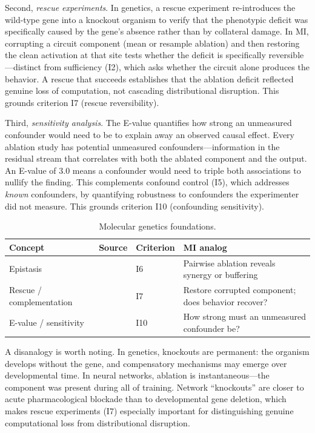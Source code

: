 \documentclass{article}
\begin{document}
Second, \emph{rescue experiments}. In genetics, a rescue experiment re-introduces the wild-type gene into a knockout organism to verify that the phenotypic deficit was specifically caused by the gene's absence rather than by collateral damage. In MI, corrupting a circuit component (mean or resample ablation) and then restoring the clean activation at that site tests whether the deficit is specifically reversible---distinct from sufficiency (I2), which asks whether the circuit alone produces the behavior. A rescue that succeeds establishes that the ablation deficit reflected genuine loss of computation, not cascading distributional disruption. This grounds criterion I7 (rescue reversibility).

Third, \emph{sensitivity analysis}. The E-value quantifies how strong an unmeasured confounder would need to be to explain away an observed causal effect. Every ablation study has potential unmeasured confounders---information in the residual stream that correlates with both the ablated component and the output. An E-value of 3.0 means a confounder would need to triple both associations to nullify the finding. This complements confound control (I5), which addresses \emph{known} confounders, by quantifying robustness to confounders the experimenter did not measure. This grounds criterion I10 (confounding sensitivity).

\begin{table}[H]
\centering\small
\caption{Molecular genetics foundations.}
\renewcommand{\arraystretch}{1.12}
\begin{tabular}{@{}l>{\raggedright\arraybackslash}p{2.2cm}l>{\raggedright\arraybackslash}p{4.5cm}@{}}
\toprule
\textbf{Concept} & \textbf{Source} & \textbf{Criterion} & \textbf{MI analog} \\
\midrule
Epistasis & \citet{fisher1918correlation} & I6 & Pairwise ablation reveals synergy or buffering \\
\midrule
Rescue / complementation & \citet{brenner1974genetics} & I7 & Restore corrupted component; does behavior recover? \\
\midrule
E-value / sensitivity & \citet{vanderweele2017sensitivity} & I10 & How strong must an unmeasured confounder be? \\
\bottomrule
\end{tabular}
\end{table}

A disanalogy is worth noting. In genetics, knockouts are permanent: the organism develops without the gene, and compensatory mechanisms may emerge over developmental time. In neural networks, ablation is instantaneous---the component was present during all of training. Network ``knockouts'' are closer to acute pharmacological blockade than to developmental gene deletion, which makes rescue experiments (I7) especially important for distinguishing genuine computational loss from distributional disruption.
\end{document}
